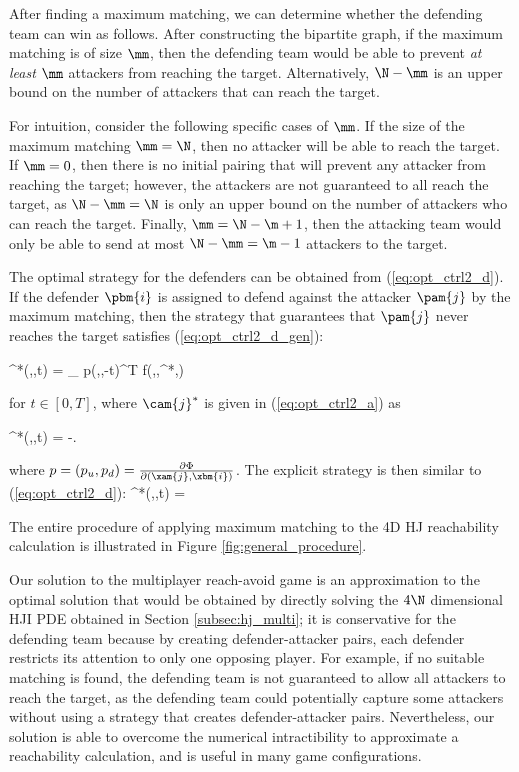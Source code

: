 After finding a maximum matching, we can determine whether the defending team can win as follows. After constructing the bipartite graph, if the maximum matching is of size $\mm$, then the defending team would be able to prevent \textit{at least} $\mm$ attackers from reaching the target. Alternatively, $\N-\mm$ is an upper bound on the number of attackers that can reach the target.

For intuition, consider the following specific cases of $\mm$. If the size of the maximum matching $\mm=\N$, then no attacker will be able to reach the target. If $\mm=0$, then there is no initial pairing that will prevent any attacker from reaching the target; however, the attackers are not guaranteed to all reach the target, as $\N-\mm=\N$ is only an upper bound on the number of attackers who can reach the target. Finally, $\mm=\N-\m+1$, then the attacking team would only be able to send at most $\N-\mm=\m-1$ attackers to the target. 

The optimal strategy for the defenders can be obtained from (\ref{eq:opt_ctrl2_d}). If the \ith defender $\pbm{i}$ is assigned to defend against the \jth attacker $\pam{j}$ by the maximum matching, then the strategy that guarantees that $\pam{j}$ never reaches the target satisfies (\ref{eq:opt_ctrl2_d_gen}): 

\bq \label{eq:opt_ctrl3_d_gen}
  ^*(,,t) = \arg \max_{ \in {}} p(,,-t)^T f(,,^*,)
\eq

\noindent for $t\in [0,T]$, where $\cam{j}^*$ is given in (\ref{eq:opt_ctrl2_a}) as

\bq \label{eq:opt_ctrl2_a}
^*(,,t) = -\vela {}.
\eq

\noindent where $p = (p_u, p_d) = \frac{\partial \Phi}{\partial (\xam{j},\xbm{i})}$. The explicit strategy is then similar to (\ref{eq:opt_ctrl2_d}):
\bq \label{eq:opt_ctrl3_d}
\cb^*(,,t) = \velb {}
\eq

The entire procedure of applying maximum matching to the 4D HJ reachability calculation is illustrated in Figure \ref{fig:general_procedure}.

Our solution to the multiplayer reach-avoid game is an approximation to the optimal solution that would be obtained by directly solving the $4\N$ dimensional HJI PDE obtained in Section \ref{subsec:hj_multi}; it is conservative for the defending team because by creating defender-attacker pairs, each defender restricts its attention to only one opposing player. For example, if no suitable matching is found, the defending team is not guaranteed to allow all attackers to reach the target, as the defending team could potentially capture some attackers without using a strategy that creates defender-attacker pairs. Nevertheless, our solution is able to overcome the numerical intractibility to approximate a reachability calculation, and is useful in many game configurations.

